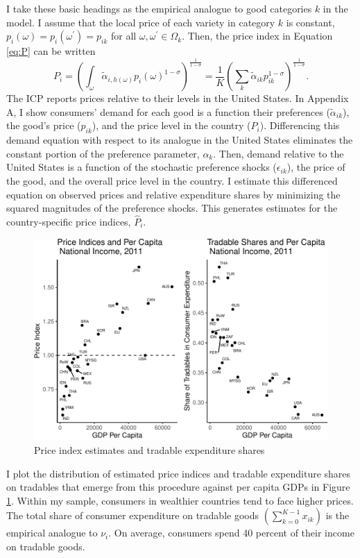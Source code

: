 \documentclass{puthesis}
\begin{document}
I take these basic headings as the empirical analogue to good categories
\(k\) in the model. I assume that the local price of each variety in
category \(k\) is constant,
\(p_i(\omega) = p_i(\omega^\prime) = p_{ik}\) for all
\(\omega, \omega^\prime \in \Omega_k\). Then, the price index in
Equation \ref{eq:P} can be written \[
P_i = \left( \int_\omega \tilde{\alpha}_{i, h(\omega)} p_i(\omega)^{1 - \sigma} \right)^{\frac{1}{1 - \sigma}} = \frac{1}{K} \left( \sum_k \tilde{\alpha}_{ik} p_{ik}^{1 - \sigma} \right)^{\frac{1}{1 - \sigma}} .
\] The ICP reports prices relative to their levels in the United States.
In Appendix A, I show consumers' demand for each good is a function
their preferences (\(\tilde{\alpha}_{ik}\)), the good's price
(\(p_{ik}\)), and the price level in the country (\(P_i\)). Differencing
this demand equation with respect to its analogue in the United States
eliminates the constant portion of the preference parameter,
\(\alpha_k\). Then, demand relative to the United States is a function
of the stochastic preference shocks (\(\epsilon_{ik}\)), the price of
the good, and the overall price level in the country. I estimate this
differenced equation on observed prices and relative expenditure shares
by minimizing the squared magnitudes of the preference shocks. This
generates estimates for the country-specific price indices,
\(\hat{P}_i\).

\begin{figure}
\centering
\includegraphics{figure/P-1.pdf}
\caption{Price index estimates and tradable expenditure shares
\label{fig:P}}
\end{figure}

I plot the distribution of estimated price indices and tradable
expenditure shares on tradables that emerge from this procedure against
per capita GDPs in Figure \ref{fig:P}. Within my sample, consumers in
wealthier countries tend to face higher prices. The total share of
consumer expenditure on tradable goods \((\sum_{k=0}^{K-1} x_{ik})\) is
the empirical analogue to \(\nu_i\). On average, consumers spend 40
percent of their income on tradable goods.
\end{document}
